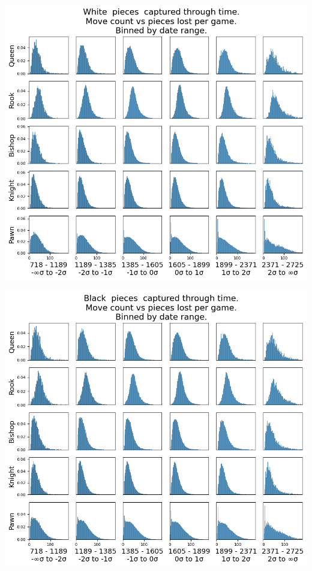 \documentclass[11pt]{article}
\begin{document}
\begin{center}
\includegraphics[width=\textwidth]{Images/_HIST_Queen_Rook_Bishop_Knight_Pawn_WHITE_ELO_FISC.png}
\end{center}

\begin{center}
\includegraphics[width=\textwidth]{Images/_HIST_Queen_Rook_Bishop_Knight_Pawn_BLACK_ELO_FISC.png}
\end{center}
\end{document}
